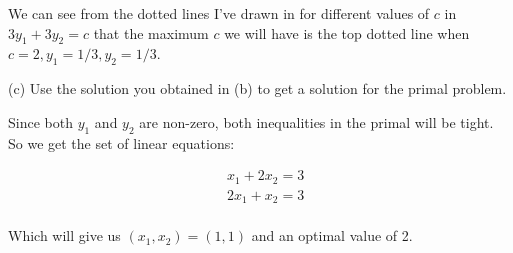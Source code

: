 \documentclass[12pt]{extarticle}
\theoremstyle{definition}
\begin{document}
\begin{problem}
\begin{description}
			We can see from the dotted lines I've drawn in for different values of $c$ in\\ $3y_1 + 3y_2 = c$ 
			that the maximum $c$ we will have is the top dotted line when\\ $c = 2, y_1 = 1/3, y_2 = 1/3$.

		\item{(c)} Use the solution you obtained in (b) to get a solution for the primal problem.

			Since both $y_1$ and $y_2$ are non-zero, both inequalities in the primal will be tight. So we get the set of linear equations:

			\begin{align*}
			& x_1+2x_2 = 3\\
			&2x_1+x_2 = 3\\
			\end{align*}

			Which will give us $(x_1, x_2) = (1, 1)$ and an optimal value of 2.
	\end{description}

\end{problem}


\small


\end{document}
